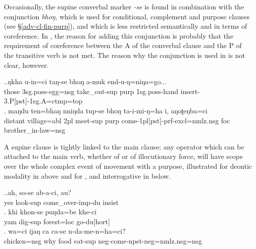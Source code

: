 Occasionally, the supine converbal marker \emph{-se} is found in combination with the conjunction \emph{bhoŋ}, which is used for conditional, complement and purpose clauses (see §\ref{adv-cl-fin-purp}), and which is less restricted semantically and in terms of coreference. In \Next[a], the reason for adding this conjunction is probably that the requirement of coreference between the A of the converbal clause and the P of the transitive  verb is not met. The reason why the conjunction is used in \Next[b] is not clear, however.  

\ex.\ag.ŋkha u-in=ci    taŋ-se    bhoŋ a-muk           end-u-ŋ=niŋa=go...\\
those {\sc 3sg.poss-}egg{\sc =nsg} take\_out{\sc -sup} {\sc purp} {\sc 1sg.poss-}hand   insert{\sc -3.P[pst]-1sg.A=ctmp=top}\\ 
\bg. maŋdu ten=bhaŋ nniŋda tup-se bhoŋ ta-i-mi-ŋ=ha i, aŋoʈeŋba=ci\\
distant village{\sc =abl} {\sc 2pl} meet{\sc -sup} {\sc purp} come{\sc -1pl[pst]-prf-excl=nmlz.nsg} {\sc foc} brother\_in-law{\sc =nsg}\\
 


A supine clause is tightly linked to the main clause; any operator which can be attached to the main verb, whether of  or of illocutionary force, will have scope over the whole complex event of movement with a purpose, illustrated for deontic modality in \LLast[b] above and for ,  and interrogative  in \Next below.  

\ex.\ag.ah,    so-se           ab-a-ci,      au?\\
yes look{\sc -sup} come\_over{\sc -imp-du} {\sc insist}\\
 
\bg. khi khon-se         puŋda=be    khe-ci\\
yam dig{\sc -sup} forest{\sc =loc} go{\sc -du[hort]}\\
 
\bg.  wa=ci         ijaŋ ca  ca-se    n-da-me-n=ha=ci?\\
chicken{\sc  =nsg} why food eat{\sc -sup} {\sc neg-}come{\sc -npst-neg=nmlz.nsg=nsg}\\
 

